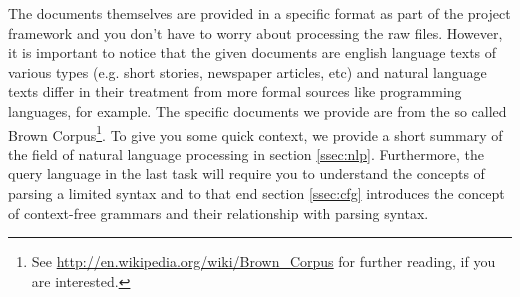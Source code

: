 \documentclass[11pt]{article}
\begin{document}
The documents themselves are provided in a specific format as part of the project framework and you don't have to worry about processing the raw files. However, it is important to notice that the given documents are english language texts of various types (e.g. short stories, newspaper articles, etc) and natural language texts differ in their treatment from more formal sources like programming languages, for example. The specific documents we provide are from the so called Brown Corpus\footnote{See \url{http://en.wikipedia.org/wiki/Brown_Corpus} for further reading, if you are interested.}. To give you some quick context, we provide a short summary of the field of natural language processing in section \ref{ssec:nlp}. Furthermore, the query language in the last task will require you to understand the concepts of parsing a limited syntax and to that end section \ref{ssec:cfg} introduces the concept of context-free grammars and their relationship with parsing syntax.
\end{document}
